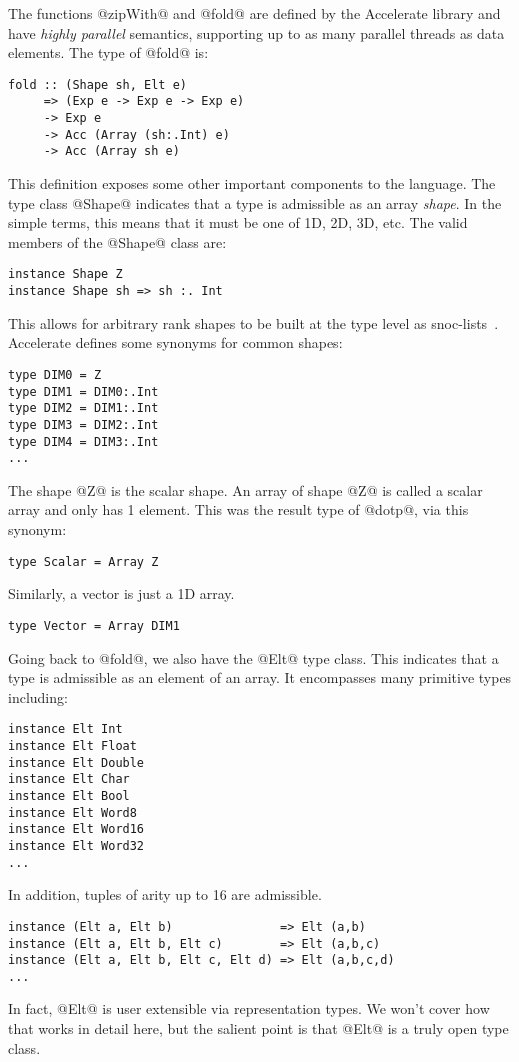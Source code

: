 The functions @zipWith@ and @fold@ are defined by the Accelerate library and have \emph{highly parallel} semantics, supporting up to as many parallel threads as data elements. The type of @fold@ is:
%
\begin{lstlisting}
fold :: (Shape sh, Elt e)
     => (Exp e -> Exp e -> Exp e)
     -> Exp e
     -> Acc (Array (sh:.Int) e)
     -> Acc (Array sh e)
\end{lstlisting}
%
This definition exposes some other important components to the language. The type class @Shape@ indicates that a type is admissible as an array \emph{shape}. In the simple terms, this means that it must be one of 1D, 2D, 3D, etc. The valid members of the @Shape@ class are:
%
\begin{lstlisting}
instance Shape Z
instance Shape sh => sh :. Int
\end{lstlisting}
%
This allows for arbitrary rank shapes to be built at the type level as snoc-lists~\citep{Keller:Repa,Chakravarty:acc-cuda}. Accelerate defines some synonyms for common shapes:
%
\begin{lstlisting}
type DIM0 = Z
type DIM1 = DIM0:.Int
type DIM2 = DIM1:.Int
type DIM3 = DIM2:.Int
type DIM4 = DIM3:.Int
...
\end{lstlisting}
%
The shape @Z@ is the scalar shape. An array of shape @Z@ is called a scalar array and only has 1 element. This was the result type of @dotp@, via this synonym:
%
\begin{lstlisting}
type Scalar = Array Z
\end{lstlisting}
%
Similarly, a vector is just a 1D array.
%
\begin{lstlisting}
type Vector = Array DIM1
\end{lstlisting}
%

Going back to @fold@, we also have the @Elt@ type class. This indicates that a type is admissible as an element of an array. It encompasses many primitive types including:
%
\begin{lstlisting}
instance Elt Int
instance Elt Float
instance Elt Double
instance Elt Char
instance Elt Bool
instance Elt Word8
instance Elt Word16
instance Elt Word32
...
\end{lstlisting}
%
In addition, tuples of arity up to 16 are admissible.
%
\begin{lstlisting}
instance (Elt a, Elt b)               => Elt (a,b)
instance (Elt a, Elt b, Elt c)        => Elt (a,b,c)
instance (Elt a, Elt b, Elt c, Elt d) => Elt (a,b,c,d)
...
\end{lstlisting}
%
In fact, @Elt@ is user extensible via representation types. We won't cover how that works in detail here, but the salient point is that @Elt@ is a truly open type class.

